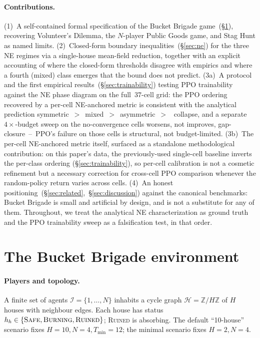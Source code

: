 \documentclass{anvil-paper}
\begin{document}
\paragraph{Contributions.} (1)~A self-contained formal specification of the
Bucket Brigade game~(\S\ref{sec:env}), recovering Volunteer's Dilemma, the
$N$-player Public Goods game, and Stag Hunt as named limits.
(2)~Closed-form boundary inequalities~(\S\ref{sec:ne}) for the three NE
regimes via a single-house mean-field reduction, together with an explicit
accounting of where the closed-form thresholds disagree with empirics and
where a fourth (\textsf{mixed}) class emerges that the bound does not
predict. (3a)~A protocol and the first empirical
results~(\S\ref{sec:trainability}) testing PPO trainability against the
NE phase diagram on the full~$37$-cell grid: the PPO ordering recovered
by a per-cell NE-anchored metric is consistent with the analytical
prediction
\textsf{symmetric}~$>$~\textsf{mixed}~$>$~\textsf{asymmetric}~$>$~%
\textsf{collapse}, and a separate~$4{\times}$-budget sweep on the
no-convergence cells worsens, not improves, gap-closure~--~PPO's
failure on those cells is structural, not budget-limited.
(3b)~The per-cell NE-anchored metric itself, surfaced as a standalone
methodological contribution: on this paper's data, the previously-used
single-cell baseline inverts the per-class ordering (\S\ref{sec:trainability}),
so per-cell calibration is not a cosmetic refinement but a necessary
correction for cross-cell PPO comparison whenever the random-policy
return varies across cells. (4)~An honest
positioning~(\S\ref{sec:related},~\S\ref{sec:discussion}) against the
canonical benchmarks: Bucket Brigade is small and artificial by design,
and is not a substitute for any of them.
Throughout, we treat the analytical NE characterization as ground truth and
the PPO trainability sweep as a falsification test, in that order.

\section{The Bucket Brigade environment}
\label{sec:env}

\paragraph{Players and topology.}
A finite set of agents $\mathcal{I}{=}\{1,\ldots,N\}$ inhabits a cycle graph
$\mathcal{H}{=}\mathbb{Z}/H\mathbb{Z}$ of $H$ houses with neighbour edges. Each
house has status $h_h\in\{\textsc{Safe},\textsc{Burning},\textsc{Ruined}\}$;
\textsc{Ruined} is absorbing. The default ``10-house'' scenario fixes
$H{=}10,N{=}4,T_{\min}{=}12$; the minimal scenario fixes $H{=}2,N{=}4$.
\end{document}
